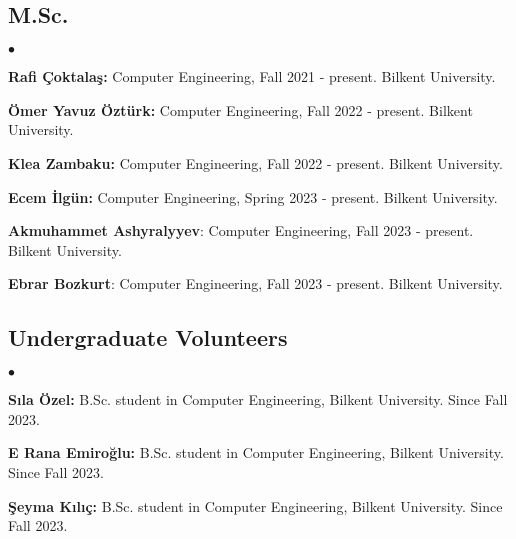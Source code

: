 \documentclass[margin,line]{res}
\newenvironment{list2}{
  \begin{list}{$\bullet$}{%
      \setlength{\itemsep}{0.1cm}
      \setlength{\parsep}{0in} \setlength{\parskip}{0in}
      \setlength{\topsep}{0in} \setlength{\partopsep}{0in} 
      \setlength{\leftmargin}{0.2in}}}{\end{list}}
\begin{document}
\begin{resume}
\vspace*{-.4cm}
\subsection{\small \sc M.Sc.}
\begin{list2}
  \item
  {\bf Rafi Çoktalaş:} Computer Engineering, Fall 2021 - present.
  Bilkent University.
    \item
  {\bf Ömer Yavuz Öztürk:} Computer Engineering, Fall 2022 - present.
  Bilkent University. 
  \item
  {\bf Klea Zambaku:} Computer Engineering, Fall 2022 - present.
  Bilkent University. 
  \item
  {\bf Ecem İlgün:} Computer Engineering, Spring 2023 - present. Bilkent University. 
  \item 
  \textbf{Akmuhammet Ashyralyyev}: Computer Engineering, Fall 2023 - present. Bilkent University. 
    \item 
  \textbf{Ebrar Bozkurt}: Computer Engineering, Fall 2023 - present. Bilkent University. 
\end{list2}

\vspace*{-.4cm}
  \subsection{\small \sc Undergraduate Volunteers}
  \begin{list2}
\item {\bf Sıla Özel:} B.Sc. student in Computer Engineering,  Bilkent University. Since Fall 2023.
\item {\bf E Rana Emiroğlu:} B.Sc. student in Computer Engineering,  Bilkent University. Since Fall 2023.
\item {\bf Şeyma Kılıç:} B.Sc. student in Computer Engineering,  Bilkent University. Since Fall 2023.
    \end{list2}




\end{resume}
\end{document}

